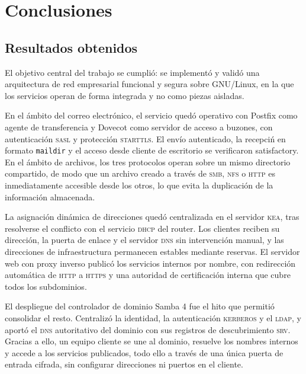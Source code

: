 
\section{Conclusiones}

\subsection{Resultados obtenidos}

El objetivo central del trabajo se cumpli\'o: se implement\'o y valid\'o una
arquitectura de red empresarial funcional y segura sobre GNU/Linux, en la
que los servicios operan de forma integrada y no como piezas aisladas.

En el \'ambito del correo electr\'onico, el servicio qued\'o operativo con
Postfix como agente de transferencia y Dovecot como servidor de acceso a
buzones, con autenticaci\'on \textsc{sasl} y protecci\'on \textsc{starttls}.
El env\'io autenticado, la recepci\'n en formato \texttt{maildir} y el acceso
desde cliente de escritorio se verificaron satisfactory. En el \'ambito de
archivos, los tres protocolos operan sobre un mismo directorio compartido,
de modo que un archivo creado a trav\'es de \textsc{smb}, \textsc{nfs} o
\textsc{http} es inmediatamente accesible desde los otros, lo que evita la
duplicaci\'on de la informaci\'on almacenada.

La asignaci\'on din\'amica de direcciones qued\'o centralizada en el servidor
\textsc{kea}, tras resolverse el conflicto con el servicio \textsc{dhcp} del
router. Los clientes reciben su direcci\'on, la puerta de enlace y el
servidor \textsc{dns} sin intervenci\'on manual, y las direcciones de
infraestructura permanecen estables mediante reservas. El servidor web con
proxy inverso public\'o los servicios internos por nombre, con
redirecci\'on autom\'atica de \textsc{http} a \textsc{https} y una autoridad
de certificaci\'on interna que cubre todos los subdominios.

El despliegue del controlador de dominio Samba 4 fue el hito que permiti\'o
consolidar el resto. Centraliz\'o la identidad, la autenticaci\'on
\textsc{kerberos} y el \textsc{ldap}, y aport\'o el \textsc{dns} autoritativo
del dominio con sus registros de descubrimiento \textsc{srv}. Gracias a
ello, un equipo cliente se une al dominio, resuelve los nombres internos y
accede a los servicios publicados, todo ello a trav\'es de una \'unica
puerta de entrada cifrada, sin configurar direcciones ni puertos en el
cliente.

